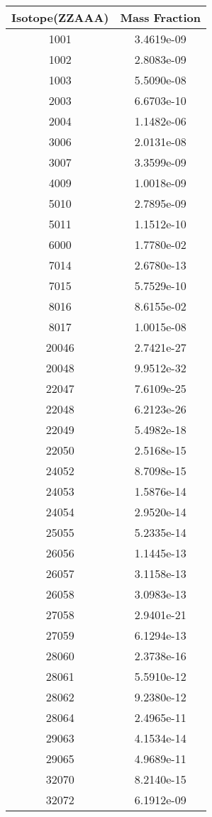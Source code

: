 \begin{table}[h!]
\centering
\begin{tabular}{|| c || c |}
\hline
Isotope(ZZAAA) & Mass Fraction \\
\hline \hline

1001 & 3.4619e-09 \\
1002 & 2.8083e-09 \\
1003 & 5.5090e-08 \\
2003 & 6.6703e-10 \\
2004 & 1.1482e-06 \\
3006 & 2.0131e-08 \\
3007 & 3.3599e-09 \\
4009 & 1.0018e-09 \\
5010 & 2.7895e-09 \\
5011 & 1.1512e-10 \\
6000 & 1.7780e-02 \\
7014 & 2.6780e-13 \\
7015 & 5.7529e-10 \\
8016 & 8.6155e-02 \\
8017 & 1.0015e-08 \\
20046 & 2.7421e-27 \\
20048 & 9.9512e-32 \\
22047 & 7.6109e-25 \\
22048 & 6.2123e-26 \\
22049 & 5.4982e-18 \\
22050 & 2.5168e-15 \\
24052 & 8.7098e-15 \\
24053 & 1.5876e-14 \\
24054 & 2.9520e-14 \\
25055 & 5.2335e-14 \\
26056 & 1.1445e-13 \\
26057 & 3.1158e-13 \\
26058 & 3.0983e-13 \\
27058 & 2.9401e-21 \\
27059 & 6.1294e-13 \\
28060 & 2.3738e-16 \\
28061 & 5.5910e-12 \\
28062 & 9.2380e-12 \\
28064 & 2.4965e-11 \\
29063 & 4.1534e-14 \\
29065 & 4.9689e-11 \\
32070 & 8.2140e-15 \\
32072 & 6.1912e-09 \\

\end{tabular}
\end{table}
